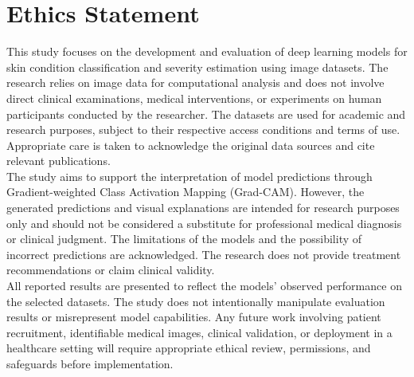 \section*{Ethics Statement}

This study focuses on the development and evaluation of deep learning models for skin condition classification and severity estimation using image datasets. The research relies on image data for computational analysis and does not involve direct clinical examinations, medical interventions, or experiments on human participants conducted by the researcher. The datasets are used for academic and research purposes, subject to their respective access conditions and terms of use. Appropriate care is taken to acknowledge the original data sources and cite relevant publications.\\

The study aims to support the interpretation of model predictions through Gradient-weighted Class Activation Mapping (Grad-CAM). However, the generated predictions and visual explanations are intended for research purposes only and should not be considered a substitute for professional medical diagnosis or clinical judgment. The limitations of the models and the possibility of incorrect predictions are acknowledged. The research does not provide treatment recommendations or claim clinical validity.\\


All reported results are presented to reflect the models' observed performance on the selected datasets. The study does not intentionally manipulate evaluation results or misrepresent model capabilities. Any future work involving patient recruitment, identifiable medical images, clinical validation, or deployment in a healthcare setting will require appropriate ethical review, permissions, and safeguards before implementation.

\pagebreak